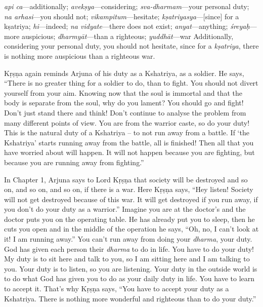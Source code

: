 {%
  \textit{api ca}---additionally; 
  \textit{avekṣya}---considering; 
  \textit{sva-dharmam}---your personal duty; 
  \textit{na arhasi}---you should not; 
  \textit{vikampitum}---hesitate; 
  \textit{kṣatriyasya}---[since] for a kṣatriya; 
  \textit{hi}---indeed; 
  \textit{na vidyate}---there does not exist; 
  \textit{anyat}---anything; 
  \textit{śreyaḥ}---more auspicious; 
  \textit{dharmyāt}---than a righteous; 
  \textit{yuddhāt}---war
}
{%
  Additionally, considering your personal duty, you should not hesitate, since for a \textit{kṣatriya}, there is nothing more auspicious than a righteous war.
}

Kṛṣṇa again reminds Arjuna of his duty as a Kshatriya, as a soldier. He says, “There is no greater thing for a soldier to do, than to fight. You should not divert yourself from your aim. Knowing now that the soul is immortal and that the body is separate from the soul, why do you lament? You should go and fight! Don’t just stand there and think! Don’t continue to analyse the problem from many different points of view. You are from the warrior caste, so do your duty! This is the natural duty of a Kshatriya – to not run away from a battle. If ‘the Kshatriya’ starts running away from the battle, all is finished! Then all that you have worried about will happen. It will not happen because you are fighting, but because you are running away from fighting.”

In Chapter 1, Arjuna says to Lord Kṛṣṇa that society will be destroyed and so on, and so on, and so on, if there is a war. Here Kṛṣṇa says, “Hey listen! Society will not get destroyed because of this war. It will get destroyed if you run away, if you don’t do your duty as a warrior.” Imagine you are at the doctor’s and the doctor puts you on the operating table. He has already put you to sleep, then he cuts you open and in the middle of the operation he says, “Oh, no, I can’t look at it! I am running away.” You can’t run away from doing your \textit{dharma}, your duty. God has given each person their \textit{dharma} to do in life. You have to do your duty! My duty is to sit here and talk to you, so I am sitting here and I am talking to you. Your duty is to listen, so you are listening. Your duty in the outside world is to do what God has given you to do as your daily duty in life. You have to learn to accept it. That’s why Kṛṣṇa says, “You have to accept your duty as a Kshatriya. There is nothing more wonderful and righteous than to do your duty.”



